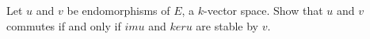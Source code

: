 Let $u$ and $v$ be endomorphisms of $E$, a $k$-vector space. Show that $u$ and $v$ commutes if and only if $im u$ and $ker u$ are stable by $v$.